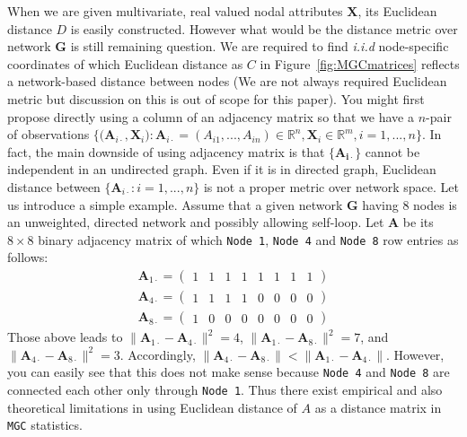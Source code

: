 \documentclass[12pt]{article}
\theoremstyle{definition}
\begin{document}
When we are given multivariate, real valued nodal attributes $\mathbf{X}$, its Euclidean distance $D$ is easily constructed. However what would be the distance metric over network $\mathbf{G}$ is still remaining question. We are required to find \textit{i.i.d} node-specific coordinates of which Euclidean distance as $C$ in Figure~\ref{fig:MGCmatrices} reflects a network-based distance between nodes (We are not always required Euclidean metric \citep{lyons2013distance} but discussion on this is out of scope for this paper). You might first propose directly using a column of an adjacency matrix so that we have a $n$-pair of observations $\big\{ \big( \mathbf{A}_{i \cdot} , \mathbf{X}_{i} \big) : \mathbf{A}_{i \cdot} = (A_{i 1} , ... , A_{i n} ) \in \mathbb{R}^{n}, \mathbf{X}_{i} \in \mathbb{R}^{m}, i=1,...,n  \big\}.$ In fact, the main downside of using adjacency matrix is that $\{ \mathbf{A_{i \cdot}}  \}$ cannot be independent in an undirected graph. Even if it is in directed graph, Euclidean distance between $\{ \mathbf{A}_{i \cdot} : i =1, ... , n \}$ is not a proper metric over network space. Let us introduce a simple example. Assume that a given network $\mathbf{G}$ having 8 nodes is an unweighted, directed network and possibly allowing self-loop. Let $\mathbf{A}$ be its $8 \times 8$ binary adjacency matrix of which \texttt{Node 1}, \texttt{Node 4} and \texttt{Node 8} row entries as follows:	
\begin{equation}
\begin{gathered}
\mathbf{A}_{1 \cdot} = \left( \begin{array}{rrrrrrrr} 1 & 1 & 1 & 1 & 1 & 1 & 1 & 1 \end{array} \right) \\
\mathbf{A}_{4 \cdot} = \left( \begin{array}{rrrrrrrr} 1 & 1 & 1 & 1 & 0 & 0 & 0 & 0 \end{array} \right) \\
\mathbf{A}_{8 \cdot} = \left( \begin{array}{rrrrrrrr} 1 & 0 & 0 & 0 & 0 & 0 & 0 & 0 \end{array} \right)
\end{gathered}
\end{equation}
Those above leads to $\parallel \mathbf{A}_{1 \cdot} -\mathbf{A}_{4 \cdot} \parallel^2 = 4$,  $\parallel \mathbf{A}_{1 \cdot} -\mathbf{A}_{8 \cdot} \parallel^2 = 7$, and $\parallel \mathbf{A}_{4 \cdot} -\mathbf{A}_{8 \cdot} \parallel^2 = 3.$ Accordingly, $\parallel \mathbf{A}_{4 \cdot} -\mathbf{A}_{8 \cdot} \parallel  < \parallel \mathbf{A}_{1 \cdot} -\mathbf{A}_{4 \cdot} \parallel$. However, you can easily see that this does not make sense because \texttt{Node 4} and \texttt{Node 8} are connected each other only through \texttt{Node 1}. Thus there exist empirical and also theoretical limitations in using Euclidean distance of $A$ as a distance matrix in \texttt{MGC} statistics. 
	
\end{document}
